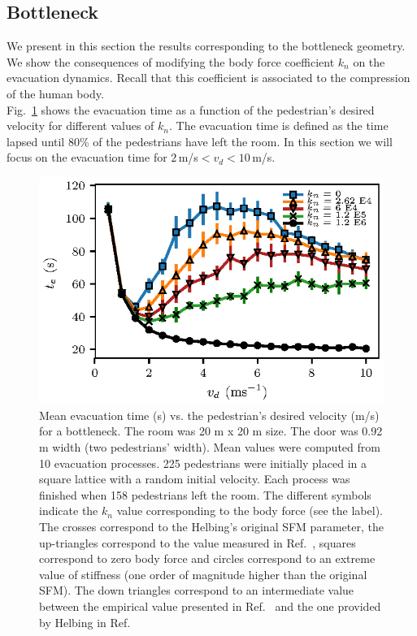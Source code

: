 \documentclass[preprint,12pt]{elsarticle}
\begin{document}
\subsection{\label{bottleneck} Bottleneck}


We present in this section the results corresponding to the bottleneck geometry.
We show the consequences of modifying the body force coefficient $k_n$ on the
evacuation dynamics. Recall that this coefficient is associated  to the
compression of the human body. \\

Fig.~\ref{vd_vs_te} shows the evacuation time as a function of the pedestrian's
desired velocity for different values of $k_n$. The evacuation  time is defined
as the time lapsed until 80\% of the pedestrians have  left the room. In this
section we will focus on the evacuation time for  $2\,$m/s$<v_d<10\,$m/s.\\


\begin{figure}[htbp!]
\centering
\includegraphics[width=0.7\columnwidth]{./vd_vs_te_N225.eps}

\caption{\label{vd_vs_te}Mean evacuation time (s) vs. the pedestrian’s desired
velocity (m/s) for a bottleneck. The room was 20 m x 20 m size. The door was
0.92 m width (two pedestrians' width). Mean values were computed from 10
evacuation processes. 225  pedestrians were initially placed in a square lattice
with a random initial  velocity. Each process was finished when 158 pedestrians
left the room. The  different symbols indicate the $k_n$ value corresponding to
the body force (see  the label). The crosses correspond to the Helbing's
original SFM parameter, the  up-triangles correspond to the value measured in
Ref.~\cite{melvin1988aatd}, squares correspond  to zero body force and circles
correspond to an extreme value of stiffness (one  order of magnitude higher than
the original SFM). The   down triangles correspond to an intermediate value
between the empirical value  presented in Ref.~\cite{melvin1988aatd} and the one
provided by Helbing in  Ref.~\cite{helbing_2000} }

\end{figure}
\end{document}
